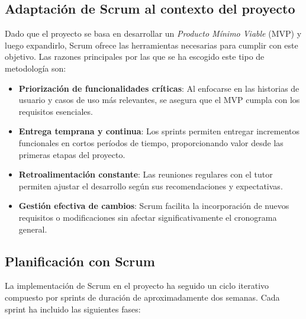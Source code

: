 \subsection{Adaptación de Scrum al contexto del proyecto}

Dado que el proyecto se basa en desarrollar un \textit{Producto Mínimo Viable} (MVP) y luego expandirlo, Scrum ofrece las herramientas necesarias para cumplir con este objetivo. Las razones principales por las que se ha escogido este tipo de metodología son:

\begin{itemize} 
	\item \textbf{Priorización de funcionalidades críticas}: Al enfocarse en las historias de usuario y casos de uso más relevantes, se asegura que el MVP cumpla con los requisitos esenciales. 
	
	\item \textbf{Entrega temprana y continua}: Los sprints permiten entregar incrementos funcionales en cortos períodos de tiempo, proporcionando valor desde las primeras etapas del proyecto. 
	
	\item \textbf{Retroalimentación constante}: Las reuniones regulares con el tutor permiten ajustar el desarrollo según sus recomendaciones y expectativas. 
	
	\item \textbf{Gestión efectiva de cambios}: Scrum facilita la incorporación de nuevos requisitos o modificaciones sin afectar significativamente el cronograma general. \end{itemize}


\subsection{Planificación con Scrum}
La implementación de Scrum en el proyecto ha seguido un ciclo iterativo compuesto por sprints de duración de aproximadamente dos semanas. Cada sprint ha incluido las siguientes fases:

